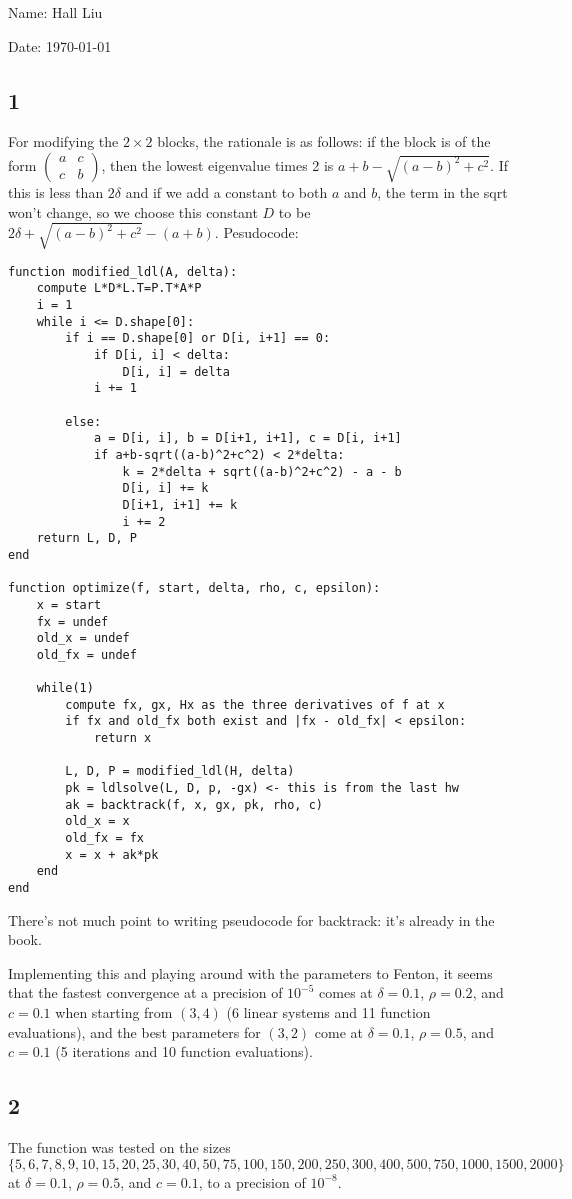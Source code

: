\documentclass{article}
\newcommand{\openm}{\begin{pmatrix}}
\newcommand{\closem}{\end{pmatrix}}
\begin{document}
Name: Hall Liu

Date: \today 
\vspace{1.5cm}
\subsection*{1}
For modifying the $2\times2$ blocks, the rationale is as follows: if the block is of the form $\openm a&c\\c&b\closem$, then the lowest eigenvalue times 2 is $a+b-\sqrt{(a-b)^2+c^2}$. If this is less than $2\delta$ and if we add a constant to both $a$ and $b$, the term in the sqrt won't change, so we choose this constant $D$ to be $2\delta+\sqrt{(a-b)^2+c^2}-(a+b)$. 
Pesudocode:
\begin{verbatim}
function modified_ldl(A, delta):
    compute L*D*L.T=P.T*A*P
    i = 1
    while i <= D.shape[0]:
        if i == D.shape[0] or D[i, i+1] == 0:
            if D[i, i] < delta:
                D[i, i] = delta
            i += 1

        else:
            a = D[i, i], b = D[i+1, i+1], c = D[i, i+1]
            if a+b-sqrt((a-b)^2+c^2) < 2*delta:
                k = 2*delta + sqrt((a-b)^2+c^2) - a - b
                D[i, i] += k
                D[i+1, i+1] += k
                i += 2
    return L, D, P
end

function optimize(f, start, delta, rho, c, epsilon):
    x = start
    fx = undef
    old_x = undef
    old_fx = undef

    while(1)
        compute fx, gx, Hx as the three derivatives of f at x
        if fx and old_fx both exist and |fx - old_fx| < epsilon:
            return x

        L, D, P = modified_ldl(H, delta)
        pk = ldlsolve(L, D, p, -gx) <- this is from the last hw
        ak = backtrack(f, x, gx, pk, rho, c)
        old_x = x
        old_fx = fx
        x = x + ak*pk
    end
end
\end{verbatim}
There's not much point to writing pseudocode for backtrack: it's already in the book.

Implementing this and playing around with the parameters to Fenton, it seems that the fastest convergence at a precision of $10^{-5}$ comes at $\delta=0.1$, $\rho=0.2$, and $c=0.1$ when starting from $(3,4)$ (6 linear systems and 11 function evaluations), and the best parameters for $(3,2)$ come at $\delta=0.1$, $\rho=0.5$, and $c=0.1$ (5 iterations and 10 function evaluations).
\subsection*{2}
The function was tested on the sizes
\[\{5,6,7,8,9,10,15,20,25,30,40,50,75,100,150,200,250,300,400,500,750,1000, 1500,2000\}\]
at $\delta=0.1$, $\rho=0.5$, and $c=0.1$, to a precision of $10^{-8}$.
\end{document}
